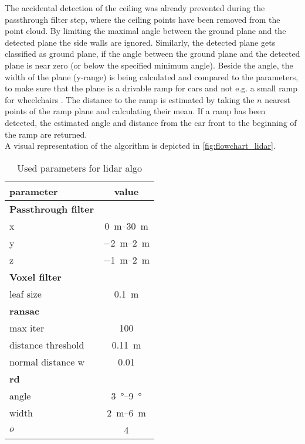 The accidental detection of the ceiling was already prevented during the passthrough filter step, where the ceiling points have been removed from the point cloud.
By limiting the maximal angle between the ground plane and the detected plane the side walls are ignored.
Similarly, the detected plane gets classified as ground plane, if the angle between the ground plane and the detected plane is near zero (or below the specified minimum angle).
Beside the angle, the width of the plane (y-range) is being calculated and compared to the parameters, to make sure that the plane is a drivable ramp for cars and not e.g. a small ramp for wheelchairs .
The distance to the ramp is estimated by taking the $n$ nearest points of the ramp plane and calculating their mean.
If a ramp has been detected, the estimated angle and distance from the car front to the beginning of the ramp are returned.\\
A visual representation of the algorithm is depicted in \cref{fig:flowchart_lidar}.
\begin{table}[H]
	\centering
	\caption{Used parameters for lidar algo}
	\label{tab:lidar_params}
	\begin{tabular}[t]{lc}
		\toprule
		\textbf{parameter} & \textbf{value}          \\
		\midrule
		\textbf{Passthrough filter}                  \\
		x                  & \SIrange{0}{30}{\metre} \\
		y                  & \SIrange{-2}{2}{\metre} \\
		z                  & \SIrange{-1}{2}{\metre} \\
		\midrule
		\textbf{Voxel filter}                        \\
		leaf size          & \SI{0.1}{\metre}        \\
		\midrule
		\textbf{\gls{ransac}}                        \\
		max iter           & 100                     \\
		distance threshold & \SI{0.11}{\metre}       \\
		normal distance w  & 0.01                    \\
		\midrule
		\textbf{rd}                                  \\
		angle              & \SIrange{3}{9}{\degree} \\
		width              & \SIrange{2}{6}{\metre}  \\
		$o$                & 4                       \\
		\bottomrule
	\end{tabular}
\end{table}%



